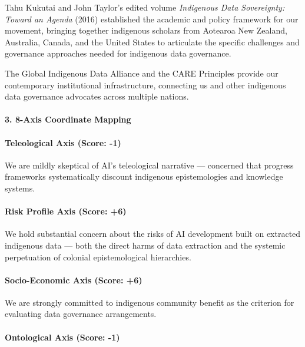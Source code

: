 Tahu Kukutai and John Taylor's edited volume \emph{Indigenous Data
Sovereignty: Toward an Agenda} (2016) established the academic and
policy framework for our movement, bringing together indigenous scholars
from Aotearoa New Zealand, Australia, Canada, and the United States to
articulate the specific challenges and governance approaches needed for
indigenous data governance.

The Global Indigenous Data Alliance and the CARE Principles provide our
contemporary institutional infrastructure, connecting us and other
indigenous data governance advocates across multiple nations.

\paragraph{3. 8-Axis Coordinate
Mapping}\label{axis-coordinate-mapping-45}

\paragraph{Teleological Axis (Score:
-1)}\label{teleological-axis-score--1-6}

We are mildly skeptical of AI's teleological narrative --- concerned
that progress frameworks systematically discount indigenous
epistemologies and knowledge systems.

\paragraph{Risk Profile Axis (Score:
+6)}\label{risk-profile-axis-score-6-6}

We hold substantial concern about the risks of AI development built on
extracted indigenous data --- both the direct harms of data extraction
and the systemic perpetuation of colonial epistemological hierarchies.

\paragraph{Socio-Economic Axis (Score:
+6)}\label{socio-economic-axis-score-6-4}

We are strongly committed to indigenous community benefit as the
criterion for evaluating data governance arrangements.

\paragraph{Ontological Axis (Score:
-1)}\label{ontological-axis-score--1-1}


